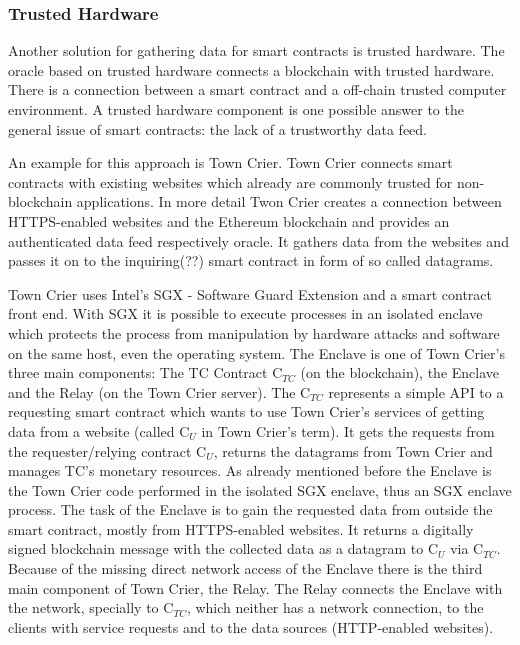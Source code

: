 \documentclass[conference]{IEEEtran}
\begin{document}
\subsubsection{Trusted Hardware}
Another solution for gathering data for smart contracts is trusted hardware. The oracle based on trusted hardware connects a blockchain with trusted hardware. There is a connection between a smart contract and a off-chain trusted computer environment. A trusted hardware component is one possible answer to the general issue of smart contracts: the lack of a trustworthy data feed.\par 
An example for this approach is Town Crier. Town Crier connects smart contracts with existing websites which already are commonly trusted for non-blockchain applications. In more detail Twon Crier creates a connection between HTTPS-enabled websites and the Ethereum blockchain and provides an authenticated data feed respectively oracle. It gathers data from the websites and passes it on to the inquiring(??) smart contract in form of so called datagrams.\par 
Town Crier uses Intel’s SGX - Software Guard Extension and a smart contract front end. With SGX it is possible to execute processes in an isolated enclave which protects the process from manipulation by hardware attacks and software on the same host, even the operating system. The Enclave is one of Town Crier's three main components: The TC Contract C$_{TC}$ (on the blockchain), the Enclave and the Relay (on the Town Crier server). The C$_{TC}$ represents a simple API to a requesting smart contract which wants to use Town Crier's services of getting data from a website (called C$_{U}$ in Town Crier's term). It gets the requests from the requester/relying contract C$_{U}$, returns the datagrams from Town Crier and manages TC's monetary resources. As already mentioned before the Enclave is the Town Crier code performed in the isolated SGX enclave, thus an SGX enclave process. The task of the Enclave is to gain the requested data from outside the smart contract, mostly from HTTPS-enabled websites. It returns a digitally signed blockchain message with the collected data as a datagram to C$_{U}$ via C$_{TC}$. Because of the missing direct network access of the Enclave there is the third main component of Town Crier, the Relay. The Relay connects the Enclave with the network, specially to C$_{TC}$, which neither has a network connection, to the clients with service requests and to the data sources (HTTP-enabled websites).\par 
\end{document}
